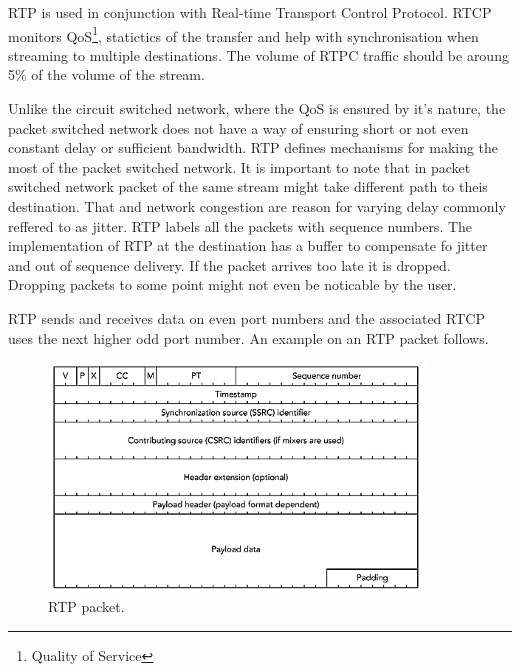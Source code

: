 RTP is used in conjunction with Real-time Transport Control Protocol. RTCP monitors QoS\footnote{Quality of Service}, statictics of the transfer and help with synchronisation when streaming to multiple destinations. The volume of RTPC traffic should be aroung 5\% of the volume of the stream.  

Unlike the circuit switched network, where the QoS is ensured by it's nature, the packet switched network does not have a way of ensuring short or not even constant delay or sufficient bandwidth. RTP defines mechanisms for making the most of the packet switched network. It is important to note that in packet switched network packet of the same stream might take different path to theis destination. That and network congestion are reason for varying delay commonly reffered to as jitter. RTP labels all the packets with sequence numbers. The implementation of RTP at the destination has a buffer to compensate fo jitter and out of sequence delivery. If the packet arrives too late it is dropped. Dropping packets to some point might not even be noticable by the user. 

RTP sends and receives data on even port numbers and the associated RTCP uses the next higher odd port number. An example on an RTP packet follows. 

\begin{figure}[ht]
	\begin{center}
	\includegraphics[width=10cm]{fig/rtp-packet.png}
	\caption{RTP packet.\cite{rtpBook}}
	\label{fig:rtpPacket}
\end{center}
\end{figure}

% 


